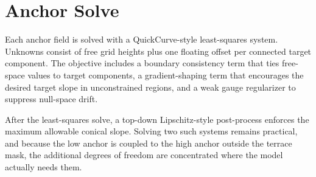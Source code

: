 \section{Anchor Solve}

Each anchor field is solved with a QuickCurve-style least-squares system. Unknowns consist of free grid heights plus one floating offset per connected target component. The objective includes a boundary consistency term that ties free-space values to target components, a gradient-shaping term that encourages the desired target slope in unconstrained regions, and a weak gauge regularizer to suppress null-space drift.

After the least-squares solve, a top-down Lipschitz-style post-process enforces the maximum allowable conical slope. Solving two such systems remains practical, and because the low anchor is coupled to the high anchor outside the terrace mask, the additional degrees of freedom are concentrated where the model actually needs them.
